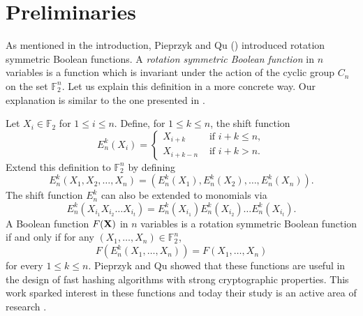 \section{Preliminaries}

As mentioned in the introduction, Pieprzyk and Qu (\cite{piequ}) introduced rotation symmetric Boolean functions. A {\it rotation symmetric Boolean function} in $n$ variables is a function which is invariant under the action of the cyclic 
group $C_n$ on the set $\mathbb{F}_2^n$.    Let us explain this definition in a more concrete way. Our explanation is similar to the one presented in \cite{stanicamaitra}.

Let $X_i\in \mathbb{F}_2$ for $1\leq i\leq n$.  Define, for $1\leq k \leq n$, the shift function
\begin{equation}
E_n^k(X_i) = \begin{cases}
 X_{i+k} & \text{ if }i+k\leq n, \\
 X_{i+k-n} & \text{ if }i+k>n.
\end{cases}
\end{equation}
Extend this definition to $\mathbb{F}_2^n$ by defining
\begin{equation}
E_n^k(X_1,X_2,\ldots, X_n) = (E_n^k(X_1),E_n^k(X_2),\ldots, E_n^k(X_n)).
\end{equation}
The shift function $E_n^k$ can also be extended to monomials via
\begin{equation}
E_n^k(X_{i_1}X_{i_2}\ldots X_{i_t}) = E_n^k(X_{i_1})E_n^k(X_{i_2})\ldots E_n^k(X_{i_t}).
\end{equation}
A Boolean function $F({\bf X})$ in $n$ variables is a rotation symmetric Boolean function if and only if for any $(X_1,\ldots, X_n)\in\mathbb{F}_2^n$, 
\begin{equation}
F(E_n^k(X_1,\ldots, X_n))=F(X_1,\ldots, X_n)
\end{equation}
for every $1\leq k\leq n$.
Pieprzyk and Qu showed that these functions are useful in the design of fast hashing algorithms with strong cryptographic properties.  This work sparked interest in these functions and today their study is 
an active area of research \cite{BCP,cusickjohns, cusickstanica, dalaimaitrasarkar, hell, maxhellmaitra, stanicamaitra, stanicamaitraclark}.

